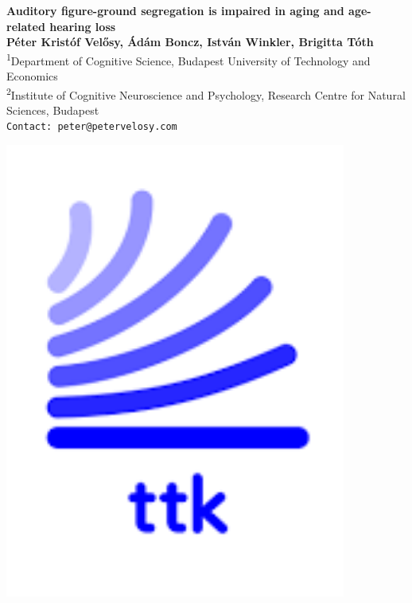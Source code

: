 \documentclass[a0,landscape]{a0poster}
\begin{document}


\begin{minipage}[b]{0.9\linewidth}
\veryHuge \color{NavyBlue} \textbf{Auditory figure-ground segregation is impaired in aging and age-related hearing loss} \color{Black}\\ %
\huge \textbf{Péter Kristóf Velősy\footnotemark[1], Ádám Boncz\footnotemark[2], István Winkler\footnotemark[2], Brigitta Tóth\footnotemark[2]}\\[0.5cm] %
\Large \textsuperscript{1}Department of Cognitive Science, Budapest University of Technology and Economics\\[0.4cm] %
\Large \textsuperscript{2}Institute of Cognitive Neuroscience and Psychology,
Research Centre for Natural Sciences, Budapest\\[0.4cm] %
\Large \texttt{Contact: peter@petervelosy.com}\\
\end{minipage}
%
\begin{minipage}[b]{0.1\linewidth}
	\includegraphics[height=15cm, right]{ttk_logo_cropped.png}
\end{minipage}
\end{document}
